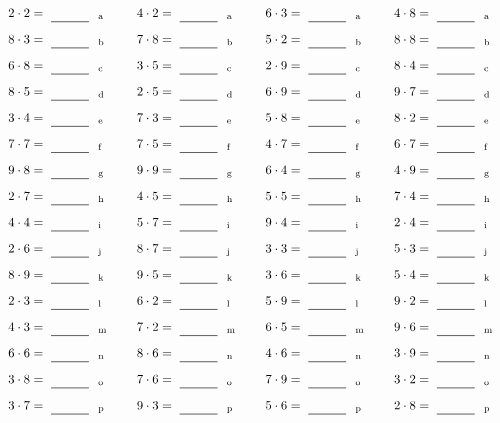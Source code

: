 \documentclass
[
  draft    = true,
  fontsize = 11pt,
  parskip  = half-
]
{scrartcl}
\begin{document}
\par\vfill\par
\begin{align*}
    \pline{2\cdot2}&=\rline{a}
  & \pline{4\cdot2}&=\rline{a}
  & \pline{6\cdot3}&=\rline{a}
  & \pline{4\cdot8}&=\rline{a} \\[1ex]
    \pline{8\cdot3}&=\rline{b}
  & \pline{7\cdot8}&=\rline{b}
  & \pline{5\cdot2}&=\rline{b}
  & \pline{8\cdot8}&=\rline{b} \\[1ex]
    \pline{6\cdot8}&=\rline{c}
  & \pline{3\cdot5}&=\rline{c}
  & \pline{2\cdot9}&=\rline{c}
  & \pline{8\cdot4}&=\rline{c} \\[1ex]
    \pline{8\cdot5}&=\rline{d}
  & \pline{2\cdot5}&=\rline{d}
  & \pline{6\cdot9}&=\rline{d}
  & \pline{9\cdot7}&=\rline{d} \\[1ex]
    \pline{3\cdot4}&=\rline{e}
  & \pline{7\cdot3}&=\rline{e}
  & \pline{5\cdot8}&=\rline{e}
  & \pline{8\cdot2}&=\rline{e} \\[1ex]
    \pline{7\cdot7}&=\rline{f}
  & \pline{7\cdot5}&=\rline{f}
  & \pline{4\cdot7}&=\rline{f}
  & \pline{6\cdot7}&=\rline{f} \\[1ex]
    \pline{9\cdot8}&=\rline{g}
  & \pline{9\cdot9}&=\rline{g}
  & \pline{6\cdot4}&=\rline{g}
  & \pline{4\cdot9}&=\rline{g} \\[1ex]
    \pline{2\cdot7}&=\rline{h}
  & \pline{4\cdot5}&=\rline{h}
  & \pline{5\cdot5}&=\rline{h}
  & \pline{7\cdot4}&=\rline{h} \\[1ex]
    \pline{4\cdot4}&=\rline{i}
  & \pline{5\cdot7}&=\rline{i}
  & \pline{9\cdot4}&=\rline{i}
  & \pline{2\cdot4}&=\rline{i} \\[1ex]
    \pline{2\cdot6}&=\rline{j}
  & \pline{8\cdot7}&=\rline{j}
  & \pline{3\cdot3}&=\rline{j}
  & \pline{5\cdot3}&=\rline{j} \\[1ex]
    \pline{8\cdot9}&=\rline{k}
  & \pline{9\cdot5}&=\rline{k}
  & \pline{3\cdot6}&=\rline{k}
  & \pline{5\cdot4}&=\rline{k} \\[1ex]
    \pline{2\cdot3}&=\rline{l}
  & \pline{6\cdot2}&=\rline{l}
  & \pline{5\cdot9}&=\rline{l}
  & \pline{9\cdot2}&=\rline{l} \\[1ex]
    \pline{4\cdot3}&=\rline{m}
  & \pline{7\cdot2}&=\rline{m}
  & \pline{6\cdot5}&=\rline{m}
  & \pline{9\cdot6}&=\rline{m} \\[1ex]
    \pline{6\cdot6}&=\rline{n}
  & \pline{8\cdot6}&=\rline{n}
  & \pline{4\cdot6}&=\rline{n}
  & \pline{3\cdot9}&=\rline{n} \\[1ex]
    \pline{3\cdot8}&=\rline{o}
  & \pline{7\cdot6}&=\rline{o}
  & \pline{7\cdot9}&=\rline{o}
  & \pline{3\cdot2}&=\rline{o} \\[1ex]
    \pline{3\cdot7}&=\rline{p}
  & \pline{9\cdot3}&=\rline{p}
  & \pline{5\cdot6}&=\rline{p}
  & \pline{2\cdot8}&=\rline{p}
\end{align*}
\end{document}

